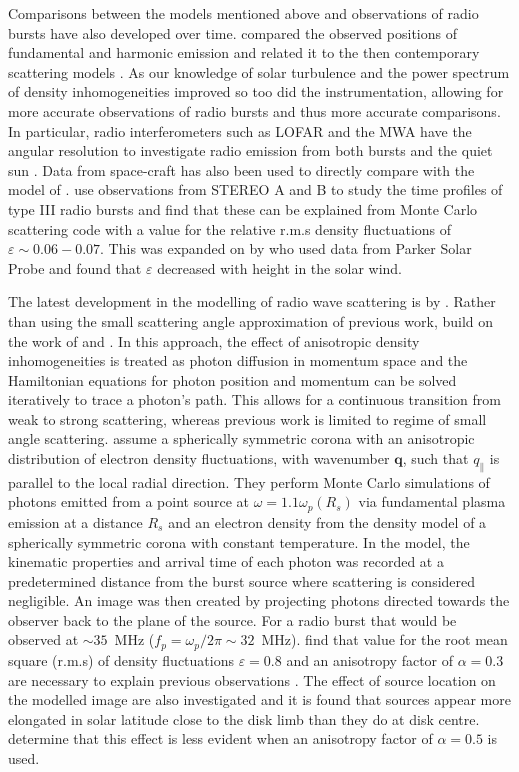 Comparisons between the models mentioned above and observations of radio bursts have also developed over time. \cite{Stewart1972} compared the observed positions of fundamental and harmonic emission and related it to the then contemporary scattering models \citep[e.g.][]{Fokker1965,Steinberg1971,Riddle1974}. As our knowledge of solar turbulence and the power spectrum of density inhomogeneities improved so too did the instrumentation, allowing for more accurate observations of radio bursts and thus more accurate comparisons. In particular, radio interferometers such as LOFAR and the MWA have the angular resolution to investigate radio emission from both bursts \citep{Zhang2020} and the quiet sun \citep{Sharma2020}. Data from space-craft has also been used to directly compare with the model of \cite{Thejappa2007}. \cite{Krupar2018} use observations from STEREO A and B to study the time profiles of type III radio bursts and find that these can be explained from Monte Carlo scattering code with a value for the relative r.m.s density fluctuations of $\varepsilon \sim 0.06-0.07$. This was expanded on by \cite{Krupar2020} who used data from Parker Solar Probe and found that $\varepsilon$ decreased with height in the solar wind.

The latest development in the modelling of radio wave scattering is by \cite{Kontar2019}. Rather than using the small scattering angle approximation of previous work, \cite{Kontar2019} build on the work of \cite{Arzner1999} and \cite{Bian2019}. In this approach, the effect of anisotropic density inhomogeneities is treated as photon diffusion in momentum space and the Hamiltonian equations for photon position and momentum can be solved iteratively to trace a photon's path. This allows for a continuous transition from weak to strong scattering, whereas previous work is limited to regime of small angle scattering. \cite{Kontar2019} assume a spherically symmetric corona with an anisotropic distribution of electron density fluctuations, with wavenumber $\mathbf{q}$, such that $q_\parallel$ is parallel to the local radial direction. They perform Monte Carlo simulations of photons emitted from a point source at $\omega = 1.1 \omega_p(R_s)$ via fundamental plasma emission at a distance $R_s$ and an electron density from the \cite{Parker1960} density model of a spherically symmetric corona with constant temperature. In the \cite{Kontar2019} model, the kinematic properties and arrival time of each photon was recorded at a predetermined distance from the burst source where scattering is considered negligible. An image was then created by projecting photons directed towards the observer back to the plane of the source. For a radio burst that would be observed at $\sim 35$~MHz ($f_p = \omega_p/2 \pi \sim 32$~MHz). \cite{Kontar2019} find that value for the root mean square (r.m.s) of density fluctuations $\varepsilon = 0.8$ and an anisotropy factor of $\alpha = 0.3$ are necessary to explain previous observations \citep{Kontar2017}. The effect of source location on the modelled image are also investigated and it is found that sources appear more elongated in solar latitude close to the disk limb than they do at disk centre. \cite{Kontar2019} determine that this effect is less evident when an anisotropy factor of $\alpha = 0.5$ is used.

